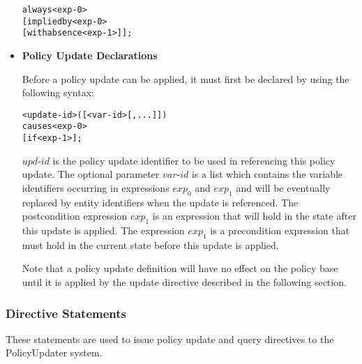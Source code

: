 \documentclass[11pt]{report}
\newenvironment{vverbatim}
{
  \begin{alltt}
}
{
    \vspace{-\baselineskip}
  \end{alltt}
}
\begin{document}
\begin{itemize}
              \begin{vverbatim}
  always <exp-0>
    [implied by <exp-0>
    [with absence <exp-1>]];
              \end{vverbatim}

            \item
              {\bf Policy Update Declarations}

              Before a policy update can be applied, it must first be declared
              by using the following syntax:

              \begin{vverbatim}
  <update-id>([<var-id>[, ...]])
    causes <exp-0>
    [if <exp-1>];
              \end{vverbatim}

              $upd$-$id$ is the policy update identifier to be used in
              referencing this policy update. The optional parameter
              $var$-$id$ is a list which contains the variable identifiers
              occurring in expressions $exp_0$ and $exp_1$ and will be
              eventually replaced by entity identifiers when the update is
              referenced. The postcondition expression $exp_1$ is an expression
              that will hold in the state after this update is applied.
              The expression $exp_1$ is a precondition expression that must
              hold in the current state before this update is applied.

              Note that a policy update definition will have no effect on the
              policy base until it is applied by the update directive
              described in the following section.

          \end{itemize}

        \subsubsection{Directive Statements}

          These statements are used to issue policy update and query directives
          to the PolicyUpdater system.
\end{document}
